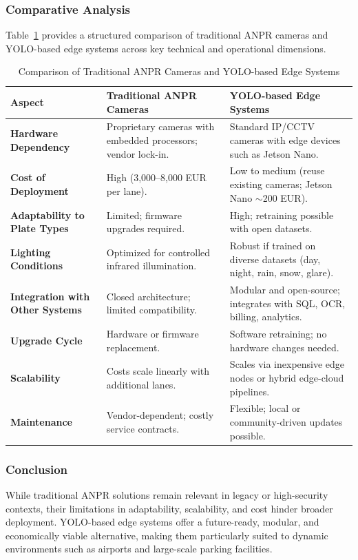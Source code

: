 	\subsubsection*{Comparative Analysis}
	Table~\ref{tab:anpr_comparison} provides a structured comparison of traditional ANPR cameras and YOLO-based edge systems across key technical and operational dimensions.
	
	\begin{table}[h!]
		\centering
		\caption{Comparison of Traditional ANPR Cameras and YOLO-based Edge Systems}
		\label{tab:anpr_comparison}
		\begin{tabular}{p{4cm} p{5.5cm} p{5.5cm}}
			\toprule
			\textbf{Aspect} & \textbf{Traditional ANPR Cameras} & \textbf{YOLO-based Edge Systems} \\
			\midrule
			\textbf{Hardware Dependency} & Proprietary cameras with embedded processors; vendor lock-in. & Standard IP/CCTV cameras with edge devices such as Jetson Nano. \\
			\textbf{Cost of Deployment} & High (3,000--8,000 EUR per lane). & Low to medium (reuse existing cameras; Jetson Nano $\sim$200 EUR). \\
			\textbf{Adaptability to Plate Types} & Limited; firmware upgrades required. & High; retraining possible with open datasets. \\
			\textbf{Lighting Conditions} & Optimized for controlled infrared illumination. & Robust if trained on diverse datasets (day, night, rain, snow, glare). \\
			\textbf{Integration with Other Systems} & Closed architecture; limited compatibility. & Modular and open-source; integrates with SQL, OCR, billing, analytics. \\
			\textbf{Upgrade Cycle} & Hardware or firmware replacement. & Software retraining; no hardware changes needed. \\
			\textbf{Scalability} & Costs scale linearly with additional lanes. & Scales via inexpensive edge nodes or hybrid edge-cloud pipelines. \\
			\textbf{Maintenance} & Vendor-dependent; costly service contracts. & Flexible; local or community-driven updates possible. \\
			\bottomrule
		\end{tabular}
	\end{table}
	
	\subsubsection*{Conclusion}
	While traditional ANPR solutions remain relevant in legacy or high-security contexts, their limitations in adaptability, scalability, and cost hinder broader deployment. YOLO-based edge systems offer a future-ready, modular, and economically viable alternative, making them particularly suited to dynamic environments such as airports and large-scale parking facilities.
	
